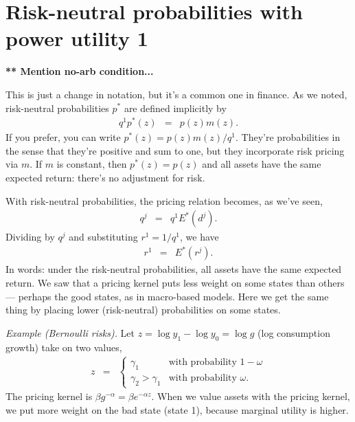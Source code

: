 \documentclass[11pt]{article}
\begin{document}
\section{Risk-neutral probabilities with power utility 1}

{\bf *** Mention no-arb condition...} 

This is just a change in notation, but it's a common one in finance.
As we noted, risk-neutral probabilities $p^*$ are defined implicitly by
\begin{eqnarray*}
    q^1 p^*(z) &=& p(z) m(z) .
\end{eqnarray*}
If you prefer, you can write $  p^*(z) = p(z) m(z)/q^1 $.
They're probabilities in the sense that they're positive and sum to one,
but they incorporate risk pricing via $m$.
If $m$ is constant, then $p^*(z) = p(z)$
and all assets have the same expected return:  there's no adjustment for risk.

With risk-neutral probabilities,
the pricing relation becomes, as we've seen,
\begin{eqnarray*}
    q^j &=& q^1 E^* (d^j).
\end{eqnarray*}
Dividing by $q^j$ and substituting $r^1 = 1/q^1$, we have
\begin{eqnarray*}
    r^1 &=& E^* (r^j).
\end{eqnarray*}
In words:  under the risk-neutral probabilities, all assets have the same expected return.
We saw that a pricing kernel puts less weight on some states than others ---
perhaps the good states, as in macro-based models.
Here we get the same thing by placing lower (risk-neutral) probabilities
on some states.

{\it Example (Bernoulli risks).\/}
Let $ z = \log y_1 - \log y_0 = \log g$ (log consumption growth)
take on two values,
\begin{eqnarray*}
    z &=&   \left\{
            \begin{array}{ll}
            \gamma_1 & \mbox{with probability } 1-\omega \\
            \gamma_2 > \gamma_1 & \mbox{with probability } \omega .
            \end{array}
            \right.
\end{eqnarray*}
The pricing kernel is $\beta g^{-\alpha} = \beta e^{-\alpha z}$.
When we value assets with the pricing kernel, we put more weight
on the bad state (state 1), because marginal utility is higher.
\end{document}
